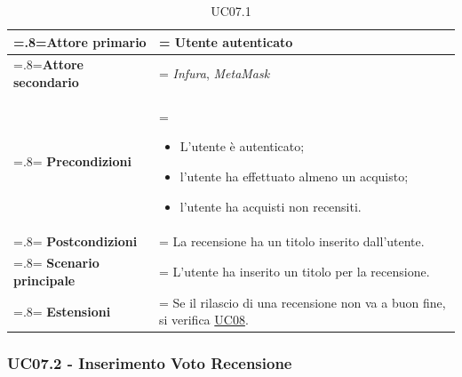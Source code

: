                 \begin{table}[H]
                    \centering
                    \renewcommand{\arraystretch}{1.8}
                    \renewcommand\tabularxcolumn[1]{m{#1}}
                    \begin{tabularx}{0.9\textwidth}{
                        >{\hsize=.8\hsize\linewidth=\hsize}X
                        >{\hsize=1.2\hsize\linewidth=\hsize}X}
                        \hline
                        \textbf{Attore primario} & Utente autenticato \\
                        \hline
                        \textbf{Attore secondario} & \textit{Infura}, \textit{MetaMask} \\
                        \hline
                        \textbf{Precondizioni} &
                            \begin{itemize}
                                \item L'utente è autenticato;
                                \item l'utente ha effettuato almeno un acquisto;
                                \item l'utente ha acquisti non recensiti.
                            \end{itemize} \\
                        \hline
                        \textbf{Postcondizioni} & La recensione ha un titolo inserito dall'utente. \\
                        \hline
                        \textbf{Scenario principale} &
                        L'utente ha inserito un titolo per la recensione. \\
                        \hline
                        \textbf{Estensioni} & Se il rilascio di una recensione non va a buon fine, si verifica \hyperref[UC08]{UC08}. \\
                        \hline
                    \end{tabularx}
                    \caption{UC07.1}
                \end{table}

            \subsubsection{UC07.2 - Inserimento Voto Recensione}
            \label{UC07.2}

